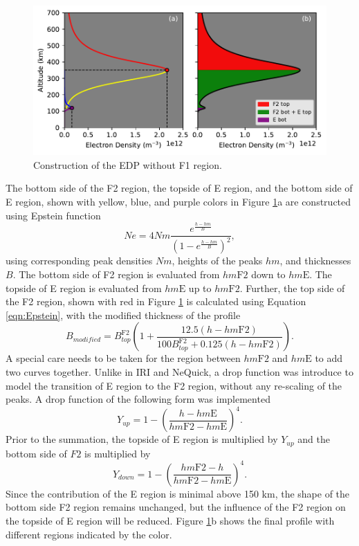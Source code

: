 \documentclass[draft]{agujournal2019}
\begin{document}
\begin{figure}[H]
  \includegraphics[scale=0.9]{Construction_of_EDP_without_F1.pdf}
  \caption{Construction of the EDP without F1 region.}
  \label{fig:EDP_no_F1}
\end{figure}

The bottom side of the F2 region, the topside of E region, and the bottom side of E region, shown with yellow, blue, and purple colors in Figure \ref{fig:EDP_no_F1}a are constructed using Epstein function 
\begin{equation}\label{eqn:Epstein}
Ne=4Nm\frac{e^{\frac{h-hm}{B}}}{\left(1-e^{\frac{h-hm}{B}}\right)^2},
\end{equation}
using corresponding peak densities $Nm$, heights of the peaks $hm$, and thicknesses $B$. The bottom side of F2 region is evaluated from $hm\mathrm{F2}$ down to $hm\mathrm{E}$. The topside of E region is evaluated from $hm\mathrm{E}$ up to $hm\mathrm{F2}$. Further, the top side of the F2 region, shown with red in Figure \ref{fig:EDP_no_F1} is calculated using Equation  \ref{eqn:Epstein}, with the modified thickness of the profile
\begin{equation}\label{eqn:B_modified}
B_{modified}=B^{\mathrm{F2}}_{top}\left(1+\frac{12.5(h-hm\mathrm{F2})}{100B^{\mathrm{F2}}_{top}+0.125(h-hm\mathrm{F2})}\right).
\end{equation}
A special care needs to be taken for the region between $hm\mathrm{F2}$ and $hm\mathrm{E}$ to add two curves together. Unlike in IRI and NeQuick, a drop function was introduce to model the transition of E region to the F2 region, without any re-scaling of the peaks. A drop function of the following form was implemented
\begin{equation}\label{eqn:drop}
Y_{up}=1-\left(\frac{h-hm\mathrm{E}}{hm\mathrm{F2}-hm\mathrm{E}}\right)^4.
\end{equation}
Prior to the summation, the topside of E region is multiplied by $Y_{up}$ and the bottom side of $F2$ is multiplied by  
\begin{equation}\label{eqn:drop}
Y_{down}=1-\left(\frac{hm\mathrm{F2}-h}{hm\mathrm{F2}-hm\mathrm{E}}\right)^4.
\end{equation}
Since the contribution of the E region is minimal above 150 km, the shape of the bottom side F2 region remains unchanged, but the influence of the F2 region on the topside of E region will be reduced. Figure \ref{fig:EDP_no_F1}b shows the final profile with different regions indicated by the color. 
\end{document}
